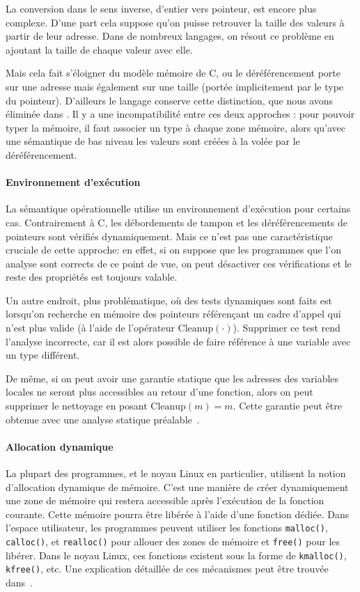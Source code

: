 La conversion dans le sens inverse, d'entier vers pointeur, est
encore plus complexe. D'une part cela suppose qu'on puisse retrouver la taille
des valeurs à partir de leur adresse. Dans de nombreux langages, on résout ce
problème en ajoutant la taille de chaque valeur avec elle.

Mais cela fait s'éloigner du modèle mémoire de C, ou le déréférencement porte
sur une adresse mais également sur une taille (portée implicitement par le type
du pointeur). D'ailleurs le langage \newspeak{} conserve cette distinction, que
nous avons éliminée dans \langname. Il y a une incompatibilité entre ces deux
approches : pour pouvoir typer la mémoire, il faut associer un type à chaque
zone mémoire, alors qu'avec une sémantique de bas niveau les valeurs sont créées
à la volée par le déréférencement.

\paragraph{Environnement d'exécution}

La sémantique opérationnelle utilise un environnement d'exécution pour certains
cas. Contrairement à C, les débordements de tampon et les déréférencements de
pointeurs sont vérifiés dynamiquement. Mais ce n'est pas une caractéristique
cruciale de cette approche: en effet, si on suppose que les programmes que l'on
analyse sont corrects de ce point de vue, on peut désactiver ces vérifications
et le reste des propriétés est toujours valable.

Un autre endroit, plus problématique, où des tests dynamiques sont faits est
lorsqu'on recherche en mémoire des pointeurs référençant un cadre d'appel qui
n'est plus valide (à l'aide de l'opérateur $\mathrm{Cleanup}(\cdot)$). Supprimer
ce test rend l'analyse incorrecte, car il est alors possible de faire référence
à une variable avec un type différent.

De même, si on peut avoir une garantie statique que les adresses des variables
locales ne seront plus accessibles au retour d'une fonction, alors on peut
supprimer le nettoyage en posant $\mathrm{Cleanup}(m) = m$. Cette garantie peut
être obtenue avec une analyse statique préalable~\cite{ifm10}.

\paragraph{Allocation dynamique}

La plupart des programmes, et le noyau Linux en particulier, utilisent la notion
d'allocation dynamique de mémoire. C'est une manière de créer dynamiquement une
zone de mémoire qui restera accessible après l'exécution de la fonction
courante. Cette mémoire pourra être libérée à l'aide d'une fonction dédiée. Dans
l'espace utilisateur, les programmes peuvent utiliser les fonctions
\verb!malloc()!, \verb!calloc()!, et \verb!realloc()! pour allouer des zones de
mémoire et \verb!free()! pour les libérer. Dans le noyau Linux, ces fonctions
existent sous la forme de \verb!kmalloc()!, \verb!kfree()!, etc. Une explication
détaillée de ces mécanismes peut être trouvée dans~\cite{LinuxVMM}.

